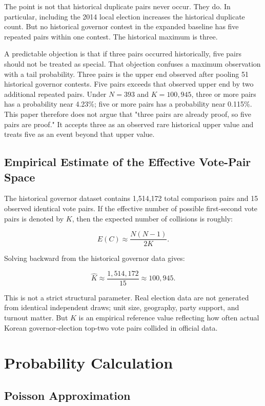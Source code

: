 \documentclass[preprint]{IEIE}
\begin{document}
The point is not that historical duplicate pairs never occur. They do. In particular, including the 2014 local election increases the historical duplicate count. But no historical governor contest in the expanded baseline has five repeated pairs within one contest. The historical maximum is three.

A predictable objection is that if three pairs occurred historically, five pairs should not be treated as special. That objection confuses a maximum observation with a tail probability. Three pairs is the upper end observed after pooling 51 historical governor contests. Five pairs exceeds that observed upper end by two additional repeated pairs. Under \(N=393\) and \(K=100,945\), three or more pairs has a probability near 4.23\%; five or more pairs has a probability near 0.115\%. This paper therefore does not argue that "three pairs are already proof, so five pairs are proof." It accepts three as an observed rare historical upper value and treats five as an event beyond that upper value.

\subsection{Empirical Estimate of the Effective Vote-Pair Space}

The historical governor dataset contains 1,514,172 total comparison pairs and 15 observed identical vote pairs. If the effective number of possible first-second vote pairs is denoted by \(K\), then the expected number of collisions is roughly:

\[
E(C) \approx \frac{N(N-1)}{2K}.
\]

Solving backward from the historical governor data gives:

\[
\hat{K} \approx \frac{1,514,172}{15} \approx 100,945.
\]

This is not a strict structural parameter. Real election data are not generated from identical independent draws; unit size, geography, party support, and turnout matter. But \(K\) is an empirical reference value reflecting how often actual Korean governor-election top-two vote pairs collided in official data.

\section{Probability Calculation}

\subsection{Poisson Approximation}
\end{document}
